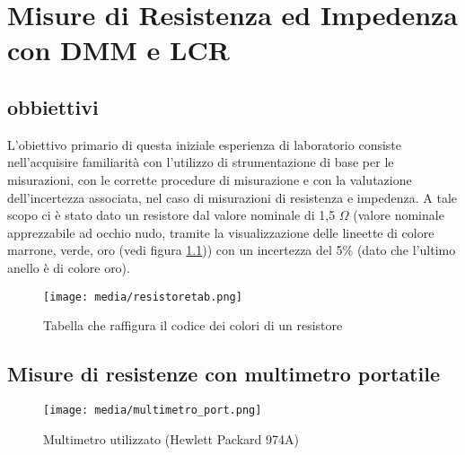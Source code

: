 \chapter{Misure di Resistenza ed Impedenza con DMM e LCR}
\label{chap:prima_prova}


\section{obbiettivi}
\label{sec:ob1}


L'obiettivo primario di questa iniziale esperienza di laboratorio consiste nell'acquisire familiarità con l'utilizzo di strumentazione di base per le misurazioni, con le corrette procedure di misurazione e con la valutazione dell'incertezza associata, nel caso di misurazioni di resistenza e impedenza.
\newline \newline
A tale scopo ci è stato dato un resistore dal valore nominale di 1,5 $\Omega$ (valore nominale apprezzabile ad occhio nudo, tramite la visualizzazione delle lineette di colore marrone, verde, oro (vedi figura \ref{fig:resistore})) con un incertezza del 5\% (dato che l'ultimo anello è di colore oro).

\begin{figure}[h]
    \centering
    \texttt{[image: media/resistoretab.png]}
    \caption{Tabella che raffigura il codice dei colori di un resistore}
    \label{fig:resistore}
\end{figure}















\section{Misure di resistenze con multimetro portatile}
\label{sec:mult_port}

\begin{figure}[h]
    \centering
    \texttt{[image: media/multimetro\_port.png]}
    \caption{Multimetro utilizzato (Hewlett Packard 974A)}
    \label{fig:multimetro_port}
\end{figure}

